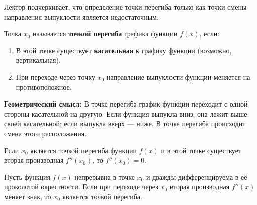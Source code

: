 Лектор подчеркивает, что определение точки перегиба только как точки смены направления выпуклости является недостаточным.

\begin{definition}
Точка $x_0$ называется \textbf{точкой перегиба} графика функции $f(x)$, если:
\begin{enumerate}
    \item В этой точке существует \textbf{касательная} к графику функции (возможно, вертикальная).
    \item При переходе через точку $x_0$ направление выпуклости функции меняется на противоположное.
\end{enumerate}
\end{definition}

\textbf{Геометрический смысл:} В точке перегиба график функции переходит с одной стороны касательной на другую. Если функция выпукла вниз, она лежит выше своей касательной; если выпукла вверх — ниже. В точке перегиба происходит смена этого расположения.

\begin{theorem}
Если $x_0$ является точкой перегиба функции $f(x)$ и в этой точке существует вторая производная $f''(x_0)$, то $f''(x_0) = 0$.
\end{theorem}

\begin{theorem}
Пусть функция $f(x)$ непрерывна в точке $x_0$ и дважды дифференцируема в её проколотой окрестности. Если при переходе через $x_0$ вторая производная $f''(x)$ меняет знак, то $x_0$ является точкой перегиба.
\end{theorem}

